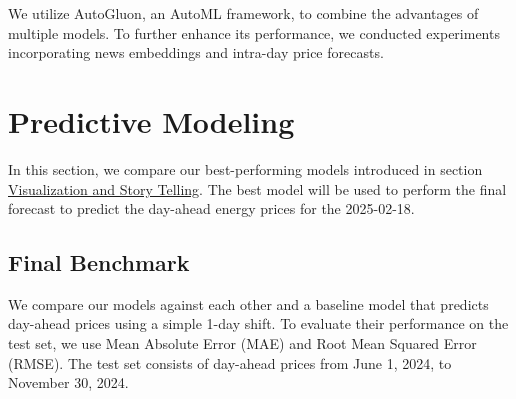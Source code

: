 \documentclass[a4paper]{article}
\begin{document}
We utilize AutoGluon, an AutoML framework, to combine the advantages of
multiple models. To further enhance its performance, we conducted
experiments incorporating news embeddings and intra-day price forecasts.

    \section{Predictive Modeling}\label{predictive-modeling}

    In this section, we compare our best-performing models introduced in
section
\hyperref[visualization-and-story-telling]{Visualization and Story Telling}.
The best model will be used to perform the final forecast to predict the
day-ahead energy prices for the 2025-02-18.

    \subsection{Final Benchmark}\label{final-benchmark}

    We compare our models against each other and a baseline model that
predicts day-ahead prices using a simple 1-day shift. To evaluate their
performance on the test set, we use Mean Absolute Error (MAE) and Root
Mean Squared Error (RMSE). The test set consists of day-ahead prices
from June 1, 2024, to November 30, 2024.
\end{document}
